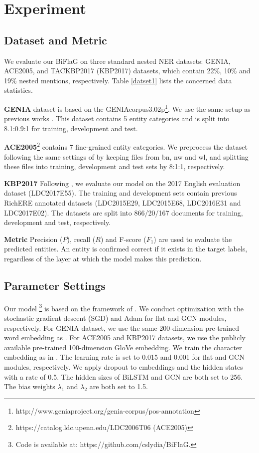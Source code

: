 \documentclass[11pt,a4paper]{article}
\begin{document}
\section{Experiment}

\subsection{Dataset and Metric}
We evaluate our BiFlaG on three standard nested NER datasets: GENIA, ACE2005, and TACKBP2017 (KBP2017) datasets, which  contain 22\%, 10\% and 19\% nested mentions, respectively. Table \ref{datset1} lists the concerned data statistics.

\textbf{GENIA} dataset \cite{kim2003genia} is based on the GENIAcorpus3.02p\footnote{http://www.geniaproject.org/genia-corpus/pos-annotation}. We use the same setup as previous works \cite{finkel2009nested, lu2015joint, lin2019sequence}. This dataset contains 5 entity categories
and is split into 8.1:0.9:1 for training, development and test.

\textbf{ACE2005}\footnote{https://catalog.ldc.upenn.edu/LDC2006T06 (ACE2005)} \cite{walker2006ace} contains 7 fine-grained entity categories. We preprocess the dataset following
the same settings of \cite{lu2015joint,wang2018neural, katiyar2018nested, lin2019sequence} by keeping files from bn, nw
and wl, and splitting these files into training, development and
test sets by 8:1:1, respectively. 

\textbf{KBP2017} Following \cite{lin2019sequence}, we evaluate our model on the 2017 English evaluation dataset (LDC2017E55). The training and development sets contain previous RichERE annotated datasets (LDC2015E29,
LDC2015E68, LDC2016E31 and LDC2017E02).
The datasets are split into 866/20/167 documents
for training, development and test, respectively.

\textbf{Metric} Precision ($P$), recall ($R$) and F-score ($F_1$) are
used to evaluate the predicted entities. 
An entity is confirmed correct if it exists in the
target labels, regardless of the layer at which the model makes this prediction.


\subsection{Parameter Settings} 
Our model \footnote{Code is available at: https://github.com/cslydia/BiFlaG.} is based on the framework of \cite{yang2018ncrf}.
We conduct optimization with the stochastic gradient descent (SGD) and Adam for flat  and GCN modules, respectively. For GENIA dataset, we use the same 200-dimension pre-trained word embedding as \cite{ju2018neural, sohrab2018deep, zheng2019boundary}. For ACE2005 and KBP2017 datasets,
we use the publicly available pre-trained 100-dimension GloVe \cite{pennington2014glove} embedding.
We train the character embedding as in \cite{xin2018learning}. 
The learning rate is set to 0.015 and 0.001 for flat and GCN modules, respectively. We apply
dropout to embeddings and the hidden states  with a rate of 0.5.
The hidden sizes of BiLSTM and GCN are both set to 256. The bias weights $\lambda_1$ and $\lambda_2$ are both set to 1.5.
\end{document}
